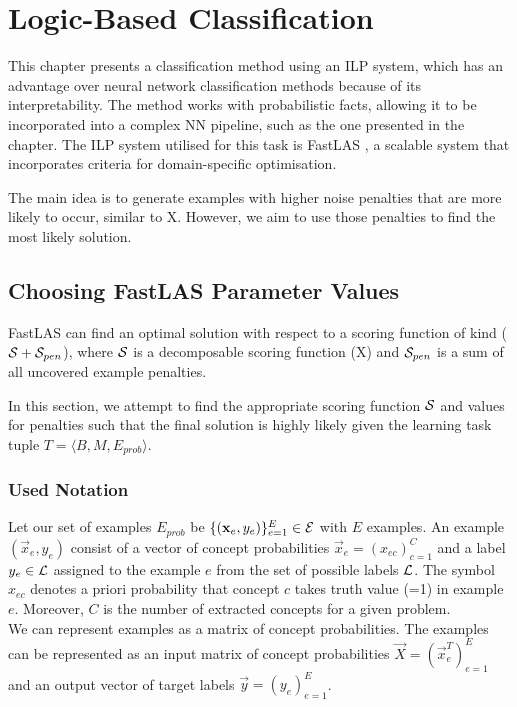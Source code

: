 \chapter{Logic-Based Classification}

This chapter presents a  classification method using an ILP system, which has an advantage over neural network classification methods because of its interpretability.
The method works with probabilistic facts, allowing it to be incorporated into a complex NN pipeline, such as the one presented in the chapter.
The ILP system utilised for this task is FastLAS \cite{RefWorks:RefID:19-law2020fastlas:}, a scalable system that incorporates criteria for domain-specific optimisation.

The main idea is to generate examples with higher noise penalties that are more likely to occur, similar to X.
However, we aim to use those penalties to find the most likely solution.


\section{Choosing FastLAS Parameter Values}

FastLAS can find an optimal solution with respect to a scoring function of kind ($\mathcal{S} + \mathcal{S}_{pen}$), where $\mathcal{S}$ is a decomposable scoring function (X) and $\mathcal{S}_{pen}$ is a sum of all uncovered example penalties.

In this section, we attempt to find the appropriate scoring function $\mathcal{S}$ and values for penalties such that the final solution is highly likely given the learning task tuple $T = \langle B, M, E_{prob} \rangle$. 

\subsection{Used Notation}

Let our set of examples $E_{prob}$ be $\{(\textbf{x}_e, y_e)\}_{e=1}^{E} \in \mathcal{E}$ with $E$ examples. 
An example $(\vec{x}_e, y_e)$ consist of a vector of concept probabilities $\vec{x}_e = (x_{ec})_{c=1}^C$ and a label $y_e \in \mathcal{L}$ assigned to the example $e$ from the set of possible labels $\mathcal{L}$.
The symbol $x_{ec}$ denotes a priori probability that concept $c$ takes truth value (=1) in example $e$.
Moreover, $C$ is the number of extracted concepts for a given problem. \\
We can represent examples as a matrix of concept probabilities.  
The examples can be represented as an input matrix of concept probabilities $\vec{X} = (\vec{x}_e^T)_{e=1}^E$ and an output vector of target labels $\vec{y} = (y_e)_{e=1}^E$.

